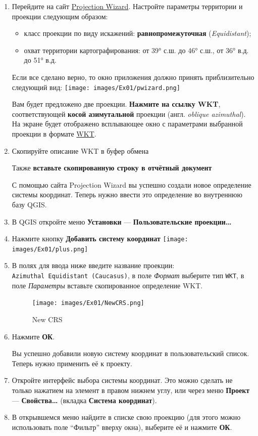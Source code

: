 \documentclass[
  12pt,
]{book}
\providecommand{\tightlist}{%
  \setlength{\itemsep}{0pt}\setlength{\parskip}{0pt}}
\begin{document}
\begin{enumerate}
\def\labelenumi{\arabic{enumi}.}
\item
  Перейдите на сайт \href{http://projectionwizard.org/}{Projection Wizard}. Настройте параметры территории и проекции следующим образом:

  \begin{itemize}
  \tightlist
  \item
    класс проекции по виду искажений: \textbf{равнопромежуточная} (\emph{Equidistant});
  \item
    охват территории картографирования: от 39° с.ш. до 46° с.ш., от 36° в.д. до 51° в.д.
  \end{itemize}

  Если все сделано верно, то окно приложения должно принять приблизительно следующий вид:
  \texttt{[image: images/Ex01/pwizard.png]}

  Вам будет предложено две проекции. \textbf{Нажмите на ссылку WKT}, соответствующей \textbf{косой азимутальной} проекции (англ. \emph{oblique azimuthal}). На экране будет отображено всплывающее окно с параметрами выбранной проекции в формате \href{https://docs.geotools.org/stable/javadocs/org/opengis/referencing/doc-files/WKT.html}{WKT}.
\item
  Скопируйте описание WKT в буфер обмена

  Также \textbf{вставьте скопированную строку в отчётный документ}

  С помощью сайта Projection Wizard вы успешно создали новое определение системы координат. Теперь нужно ввести это определение во внутреннюю базу QGIS.
\item
  В QGIS откройте меню \textbf{Установки} --- \textbf{Пользовательские проекции\ldots{}}
\item
  Нажмите кнопку \textbf{Добавить систему координат} \texttt{[image: images/Ex01/plus.png]}
\item
  В полях для ввода ниже введите название проекции: \texttt{Azimuthal\ Equidistant\ (Caucasus)}, в поле \emph{Формат} выберите тип \texttt{WKT}, в поле \emph{Параметры} вставьте скопированное определение WKT.

  \begin{figure}
  \centering
  \texttt{[image: images/Ex01/NewCRS.png]}
  \caption{New CRS}
  \end{figure}
\item
  Нажмите \textbf{ОК}.

  Вы успешно добавили новую систему координат в пользовательский список. Теперь нужно применить её к проекту.
\item
  Откройте интерфейс выбора системы координат. Это можно сделать не только нажатием на элемент в правом нижнем углу, или через меню \textbf{Проект} --- \textbf{Свойства\ldots{}} (вкладка \textbf{Система координат}).
\item
  В открывшемся меню найдите в списке свою проекцию (для этого можно использовать поле ``Фильтр'' вверху окна), выберите её и нажмите \textbf{ОК}.
\end{enumerate}
\end{document}
